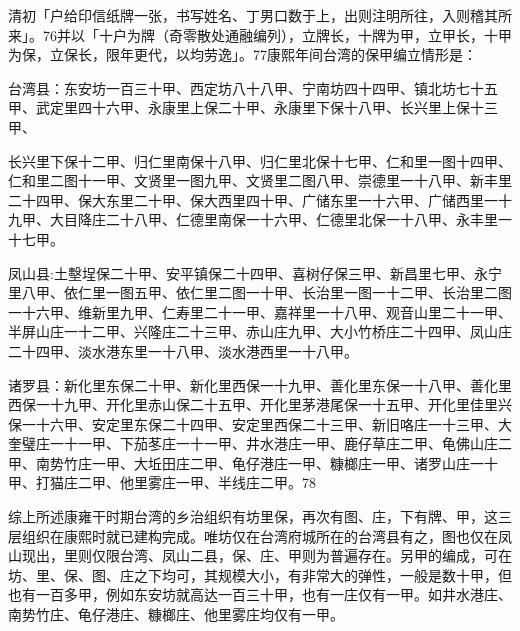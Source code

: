 
清初「户给印信纸牌一张，书写姓名、丁男口数于上，出则注明所往，入则稽其所来」。76并以「十户为牌（奇零散处通融编列），立牌长，十牌为甲，立甲长，十甲为保，立保长，限年更代，以均劳逸」。77康熙年间台湾的保甲编立情形是：

台湾县：东安坊一百三十甲、西定坊八十八甲、宁南坊四十四甲、镇北坊七十五甲、武定里四十六甲、永康里上保二十甲、永康里下保十八甲、长兴里上保十三甲、

\vfill
\begin{BookNotes}
\end{BookNotes}

\noindent 长兴里下保十二甲、归仁里南保十八甲、归仁里北保十七甲、仁和里一图十四甲、仁和里二图十一甲、文贤里一图九甲、文贤里二图八甲、崇德里一十八甲、新丰里二十四甲、保大东里二十甲、保大西里四十甲、广储东里一十六甲、广储西里一十九甲、大目降庄二十八甲、仁德里南保一十六甲、仁德里北保一十八甲、永丰里一十七甲。

凤山县:土墼埕保二十甲、安平镇保二十四甲、喜树仔保三甲、新昌里七甲、永宁里八甲、依仁里一图五甲、依仁里二图一十甲、长治里一图一十二甲、长治里二图一十六甲、维新里九甲、仁寿里二十一甲、嘉祥里一十八甲、观音山里二十一甲、半屏山庄一十二甲、兴隆庄二十三甲、赤山庄九甲、大小竹桥庄二十四甲、凤山庄二十四甲、淡水港东里一十八甲、淡水港西里一十八甲。

诸罗县：新化里东保二十甲、新化里西保一十九甲、善化里东保一十八甲、善化里西保一十九甲、开化里赤山保二十五甲、开化里茅港尾保一十五甲、开化里佳里兴保一十六甲、安定里东保二十四甲、安定里西保二十三甲、新旧咯庄一十三甲、大奎璧庄一十一甲、下茄苳庄一十一甲、井水港庄一甲、鹿仔草庄二甲、龟佛山庄二甲、南势竹庄一甲、大坵田庄二甲、龟仔港庄一甲、糠榔庄一甲、诸罗山庄一十甲、打猫庄二甲、他里雾庄一甲、半线庄二甲。78

综上所述康雍干时期台湾的乡治组织有坊里保，再次有图、庄，下有牌、甲，这三层组织在康熙时就已建构完成。唯坊仅在台湾府城所在的台湾县有之，图也仅在凤山现出，里则仅限台湾、凤山二县，保、庄、甲则为普遍存在。另甲的编成，可在坊、里、保、图、庄之下均可，其规模大小，有非常大的弹性，一般是数十甲，但也有一百多甲，例如东安坊就高达一百三十甲，也有一庄仅有一甲。如井水港庄、南势竹庄、龟仔港庄、糠榔庄、他里雾庄均仅有一甲。

